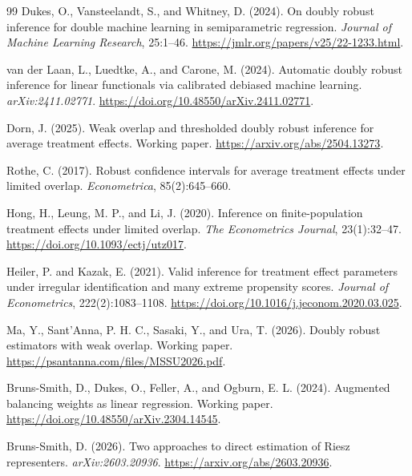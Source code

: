 \documentclass[11pt]{article}
\theoremstyle{definition}
\theoremstyle{plain}
\theoremstyle{remark}
\begin{document}
\begin{thebibliography}{99}
Dukes, O., Vansteelandt, S., and Whitney, D. (2024).
\newblock On doubly robust inference for double machine learning in
semiparametric regression.
\newblock \emph{Journal of Machine Learning Research}, 25:1--46.
\newblock \url{https://jmlr.org/papers/v25/22-1233.html}.

van der Laan, L., Luedtke, A., and Carone, M. (2024).
\newblock Automatic doubly robust inference for linear functionals via
calibrated debiased machine learning.
\newblock \emph{arXiv:2411.02771}.
\newblock \url{https://doi.org/10.48550/arXiv.2411.02771}.

Dorn, J. (2025).
\newblock Weak overlap and thresholded doubly robust inference for average
treatment effects.
\newblock Working paper.
\newblock \url{https://arxiv.org/abs/2504.13273}.

Rothe, C. (2017).
\newblock Robust confidence intervals for average treatment effects under
limited overlap.
\newblock \emph{Econometrica}, 85(2):645--660.

Hong, H., Leung, M. P., and Li, J. (2020).
\newblock Inference on finite-population treatment effects under limited
overlap.
\newblock \emph{The Econometrics Journal}, 23(1):32--47.
\newblock \url{https://doi.org/10.1093/ectj/utz017}.

Heiler, P. and Kazak, E. (2021).
\newblock Valid inference for treatment effect parameters under irregular
identification and many extreme propensity scores.
\newblock \emph{Journal of Econometrics}, 222(2):1083--1108.
\newblock \url{https://doi.org/10.1016/j.jeconom.2020.03.025}.

Ma, Y., Sant'Anna, P. H. C., Sasaki, Y., and Ura, T. (2026).
\newblock Doubly robust estimators with weak overlap.
\newblock Working paper.
\newblock \url{https://psantanna.com/files/MSSU2026.pdf}.

Bruns-Smith, D., Dukes, O., Feller, A., and Ogburn, E. L. (2024).
\newblock Augmented balancing weights as linear regression.
\newblock Working paper.
\newblock \url{https://doi.org/10.48550/arXiv.2304.14545}.

Bruns-Smith, D. (2026).
\newblock Two approaches to direct estimation of Riesz representers.
\newblock \emph{arXiv:2603.20936}.
\newblock \url{https://arxiv.org/abs/2603.20936}.
\end{thebibliography}
\end{document}
